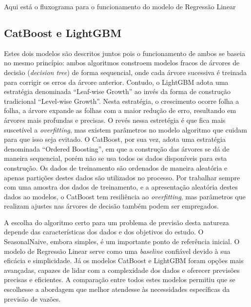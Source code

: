 Aqui está o fluxograma para o funcionamento do modelo de Regressão Linear 

\subsection{CatBoost e LightGBM}

Estes dois modelos são descritos juntos pois o funcionamento de ambos se baseia no mesmo princípio: ambos algoritmos constroem modelos fracos de árvores de decisão (\textit{decision tree}) de forma sequencial, onde cada árvore sucessiva é treinada para corrigir os erros da árvore anterior. Contudo, o LightGBM adota uma estratégia denominada ``Leaf-wise Growth'' ao invés da forma de construção tradicional ``Level-wise Growth''. Nesta estratégia, o crescimento ocorre folha a folha, a árvore expande as folhas com a maior redução de erro, resultando em árvores mais profundas e precisas. O revés nessa estretégia é que fica mais suscetível a \textit{overfitting}, mas existem parâmetros no modelo algoritmo que cuidam para que isso seja evitado. O CatBoost, por sua vez, adota uma estratégia denominada ``Ordered Boosting'', em que a construção das árvores se dá de maneira sequencial, porém não se usa todos os dados disponíveis para esta construção. Os dados de treinamento são ordenados de maneira aleatória e apenas partições destes dados são utilizados no processo. Por trabalhar sempre com uma amostra dos dados de treinamento, e a apresentação aleatória destes dados ao modelos, o CatBoost tem resiliência ao \textit{overfitting}, mas parâmetros que realizam ajustes nas árvores de decisão também podem ser empregados.


A escolha do algoritmo certo para um problema de previsão desta natureza depende das características dos dados e dos objetivos do estudo. O SeasonalNaive, embora simples, é um importante ponto de referência inicial. O modelo de Regressão Linear serve como uma \textit{baseline} confiável devido à sua eficácia e simplicidade. Já os modelos CatBoost e LightGBM foram opções mais avançadas, capazes de lidar com a complexidade dos dados e oferecer previsões precisas e eficientes. A comparação entre todos estes modelos permitiu que se escolhesse a abordagem que melhor atendesse às necessidades específicas da previsão de vazões.

